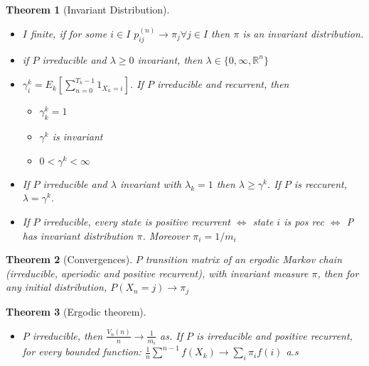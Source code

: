 \documentclass{article}
\newtheorem{theorem}{Theorem}
\begin{document}
\begin{theorem}[Invariant Distribution]
  \begin{itemize}
  \item $I$ finite, if for some $i \in I$ $p_{ij}^{(n)} \rightarrow \pi_j \forall j \in I$ then $\pi$ is an invariant distribution.
  \item if $P$ irreducible and $\lambda \ge 0$ invariant, then $\lambda \in \{0, \infty, \mathbb R^n\}$
  \item $\gamma_i^k = E_k [\sum^{T_k-1}_{n = 0} 1_{X_n = i}]$.
    If $P$ irreducible and recurrent, then
    \begin{itemize}
    \item $\gamma_k^k = 1$
    \item $\gamma^k$ is invariant
    \item $0 < \gamma^k < \infty$
    \end{itemize}
  \item If $P$ irreducible and $\lambda$ invariant with $\lambda_k = 1$ then $\lambda \ge \gamma^k$. If $P$ is reccurent, $\lambda = \gamma^k$.
  \item If $P$ irreducible, every state is positive recurrent $\iff$ state $i$ is pos rec $\iff$ P has invariant distribution $\pi$. Moreover $\pi_i = 1/m_i$
  \end{itemize}
\end{theorem}
\begin{theorem}[Convergences]
  $P$ transition matrix of an ergodic Markov chain (irreducible, aperiodic and positive recurrent), with invariant measure $\pi$, then for any initial distribution, $P(X_n = j) \rightarrow \pi_j$
\end{theorem}

\begin{theorem}[Ergodic theorem]
  \begin{itemize}
  \item $P$ irreducible, then $\frac{V_n(n)}{n} \rightarrow \frac{1}{m_i}$ as.
    If $P$ is irreducible and positive recurrent, for every bounded function:
    $\frac{1}{n} \sum^{n-1} f(X_k) \rightarrow \sum_i \pi_i f(i)$ a.s 
  \end{itemize}

\end{theorem}
\end{document}
